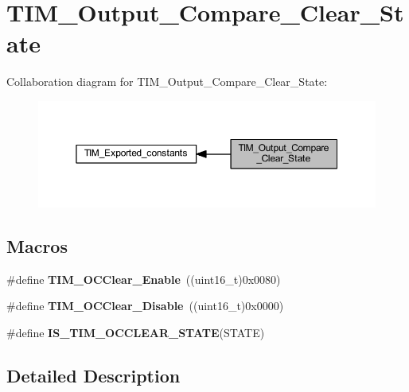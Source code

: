 \hypertarget{group___t_i_m___output___compare___clear___state}{}\section{T\+I\+M\+\_\+\+Output\+\_\+\+Compare\+\_\+\+Clear\+\_\+\+State}
\label{group___t_i_m___output___compare___clear___state}
Collaboration diagram for T\+I\+M\+\_\+\+Output\+\_\+\+Compare\+\_\+\+Clear\+\_\+\+State\+:
\nopagebreak
\begin{figure}[H]
\begin{center}
\leavevmode
\includegraphics[width=350pt]{group___t_i_m___output___compare___clear___state}
\end{center}
\end{figure}
\subsection*{Macros}
\begin{DoxyCompactItemize}
\item 
\mbox{\label{group___t_i_m___output___compare___clear___state_ga1b7bce48b3e1478aad98c95fbbe7a6e0}} 
\#define {\bfseries T\+I\+M\+\_\+\+O\+C\+Clear\+\_\+\+Enable}~((uint16\+\_\+t)0x0080)
\item 
\mbox{\label{group___t_i_m___output___compare___clear___state_gadb09946cb5dded7520baf4b19173204d}} 
\#define {\bfseries T\+I\+M\+\_\+\+O\+C\+Clear\+\_\+\+Disable}~((uint16\+\_\+t)0x0000)
\item 
\#define {\bfseries I\+S\+\_\+\+T\+I\+M\+\_\+\+O\+C\+C\+L\+E\+A\+R\+\_\+\+S\+T\+A\+TE}(S\+T\+A\+TE)
\end{DoxyCompactItemize}


\subsection{Detailed Description}


